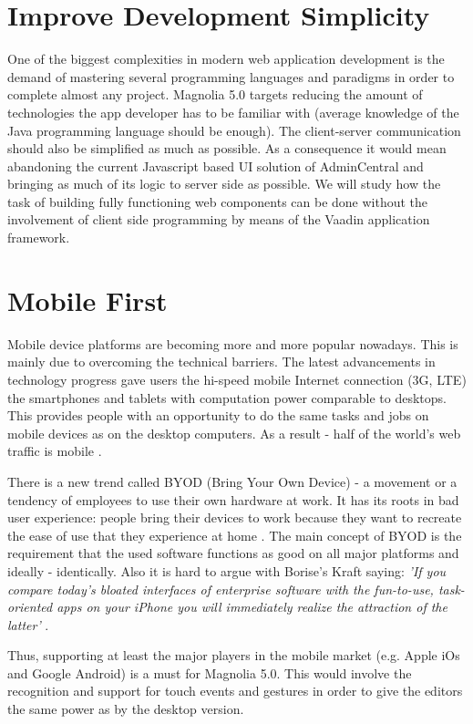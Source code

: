 \section{Improve Development Simplicity}
One of the biggest complexities in modern web application development is the
demand of mastering several programming languages and paradigms in order to
complete almost any project. Magnolia 5.0 targets reducing the amount of
technologies the app developer has to be familiar with (average knowledge of the
Java programming language should be enough). The client-server communication
should also be simplified as much as possible. As a consequence it would mean
abandoning the current Javascript based UI solution of AdminCentral and bringing
as much of its logic to server side as possible.
We will study how the task of building fully functioning web components can be
done without the involvement of client side programming by means of the Vaadin
application framework.

\section{Mobile First}
Mobile device platforms are becoming more and more popular nowadays. This is
mainly due to overcoming the technical barriers. The latest advancements in
technology progress gave users the hi-speed mobile Internet connection (3G, LTE)
the smartphones and tablets with computation power comparable to desktops. This
provides people with an opportunity to do the same tasks and jobs on mobile
devices as on the desktop computers. As a result - half of the world's web
traffic is mobile \cite{virtual_presence}.

There is a new trend called BYOD (Bring Your Own Device) - a movement or a
tendency of employees to use their own hardware at work. It has its roots in bad
user experience: people bring their devices to work because they want to
recreate the ease of use that they experience at home \cite{bkg_of_new_design}.
The main concept of BYOD is the requirement that the used software functions as
good on all major platforms and ideally - identically. Also it is hard to argue
with Borise's Kraft saying:
\emph{'If you compare today's bloated interfaces of enterprise software with the
fun-to-use, task-oriented apps on your iPhone you will immediately realize the
attraction of the latter'} \cite{mobile_first}.

Thus, supporting at least the major players in the mobile market (e.g. Apple iOs and
Google Android) is a must for Magnolia 5.0. This would involve the recognition
and support for touch events and gestures in order to give the editors the same
power as by the desktop version. 

